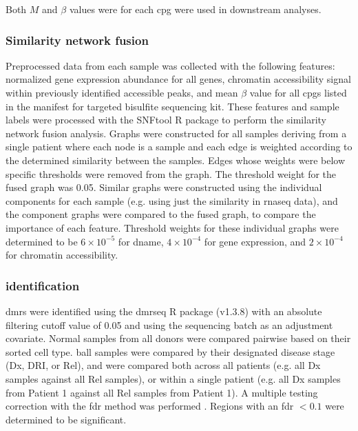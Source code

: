Both $M$ and $\beta$ values were for each \gls{cpg} were used in downstream analyses.

\subsubsection{Similarity network fusion}
\label{sec:BALL_snf}

Preprocessed data from each sample was collected with the following features: normalized gene expression abundance for all genes, chromatin accessibility signal within previously identified accessible peaks, and mean $\beta$ value for all \glspl{cpg} listed in the manifest for targeted bisulfite sequencing kit.
These features and sample labels were processed with the SNFtool R package \cite{wangSimilarityNetworkFusion2014} to perform the similarity network fusion analysis.
Graphs were constructed for all samples deriving from a single patient where each node is a sample and each edge is weighted according to the determined similarity between the samples.
Edges whose weights were below specific thresholds were removed from the graph.
The threshold weight for the fused graph was 0.05.
Similar graphs were constructed using the individual components for each sample (e.g. using just the similarity in \gls{rnaseq} data), and the component graphs were compared to the fused graph, to compare the importance of each feature.
Threshold weights for these individual graphs were determined to be $6 \times 10^{-5}$ for \gls{dname}, $4 \times 10^{-4}$ for gene expression, and $2 \times 10^{-4}$ for chromatin accessibility.

\subsubsection{ identification}

\Glspl{dmr} were identified using the dmrseq R package (v1.3.8) \cite{korthauerDetectionAccurateFalse2018} with an absolute filtering cutoff value of 0.05 and using the sequencing batch as an adjustment covariate.
Normal samples from all donors were compared pairwise based on their sorted cell type.
\Gls{ball} samples were compared by their designated disease stage (Dx, DRI, or Rel), and were compared both across all patients (e.g. all Dx samples against all Rel samples), or within a single patient (e.g. all Dx samples from Patient 1 against all Rel samples from Patient 1).
A multiple testing correction with the \gls{fdr} method was performed \cite{benjaminiControllingFalseDiscovery1995}.
Regions with an \gls{fdr} $< 0.1$ were determined to be significant.

